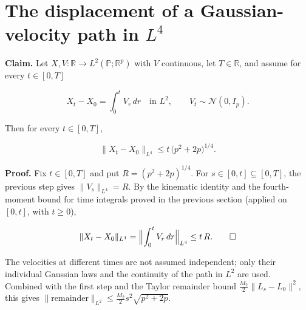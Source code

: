 \documentclass[11pt,a4paper]{article}
\begin{document}
\section{\texorpdfstring{The displacement of a Gaussian-velocity path in \(L^4\)}{The displacement of a Gaussian-velocity path in L⁴}}


\textbf{Claim.} Let \(X,V:\mathbb R\to L^2(\mathbb P;\mathbb R^p)\) with \(V\) continuous, let \(T\in\mathbb R\), and assume for every \(t\in[0,T]\)


\[X_t-X_0=\int_0^tV_r\,dr\quad\text{in }L^2,\qquad V_t\sim\mathcal N(0,I_p).\]


Then for every \(t\in[0,T]\),


\[\|X_t-X_0\|_{L^4}\le t\,\bigl(p^2+2p\bigr)^{1/4}.\]


\textbf{Proof.} Fix \(t\in[0,T]\) and put \(R=(p^2+2p)^{1/4}\). For \(s\in[0,t]\subseteq[0,T]\), the previous step gives \(\|V_s\|_{L^4}=R\). By the kinematic identity and the fourth-moment bound for time integrals proved in the previous section (applied on \([0,t]\), with \(t\ge0\)),


\[\|X_t-X_0\|_{L^4}=\Bigl\|\int_0^tV_r\,dr\Bigr\|_{L^4}\le t\,R.\qquad\square\]


The velocities at different times are not assumed independent; only their individual Gaussian laws and the continuity of the path in \(L^2\) are used. Combined with the first step and the Taylor remainder bound \(\frac{M_2}{2}\|L_s-L_0\|^2\), this gives \(\|\text{remainder}\|_{L^2}\le\frac{M_2}{2}s^2\sqrt{p^2+2p}\).
\end{document}
